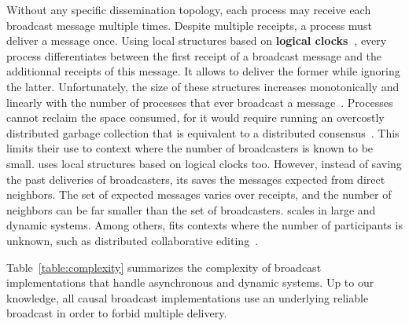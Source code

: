 Without any specific dissemination topology, each process may receive each
broadcast message multiple times. Despite multiple receipts, a process must
deliver a message once.
Using local structures based on \textbf{logical clocks~\cite{lamport1978time}},
every process differentiates between the first receipt of a broadcast message
and the additionnal receipts of this message. It allows to deliver the former
while ignoring the latter. Unfortunately, the size of these structures increases
monotonically and linearly with the number of processes that ever broadcast a
message~\cite{malkhi2007concise,mukund2014optimized}.  Processes cannot reclaim
the space consumed, for it would require running an overcostly distributed
garbage collection that is equivalent to a distributed
consensus~\cite{abdullahi1998garbage}.  This limits their use to context where
the number of broadcasters is known to be small.  \RPCBROADCAST uses local
structures based on logical clocks too. However, instead of saving the past
deliveries of broadcasters, its saves the messages expected from direct
neighbors. The set of expected messages varies over receipts, and the number of
neighbors can be far smaller than the set of broadcasters. \RPCBROADCAST scales
in large and dynamic systems. Among others, \RPCBROADCAST fits contexts where
the number of participants is unknown, such as distributed collaborative
editing~\cite{nedelec2016crate}.


Table~\ref{table:complexity} summarizes the complexity of broadcast
implementations that handle asynchronous and dynamic systems. Up to our
knowledge, all causal broadcast implementations use an underlying reliable
broadcast in order to forbid multiple delivery. 

